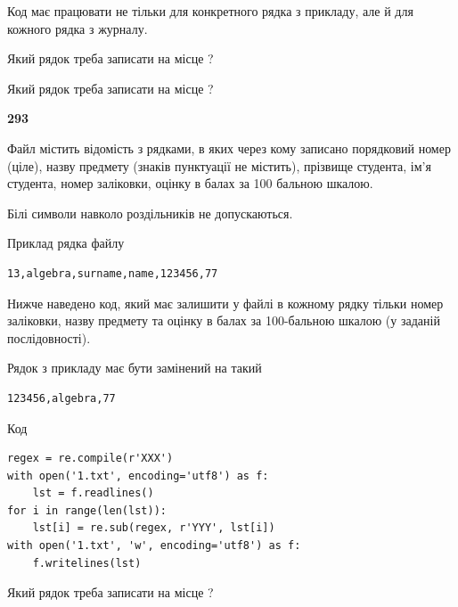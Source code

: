 Код має працювати не тільки для конкретного рядка з прикладу, але й для кожного рядка з журналу.




Який рядок треба записати на місце  ?\par
\vspace{5mm}


Який рядок треба записати на місце  ?\par


\newpage

{\begin {center}\textbf{ 293}\end {center}}\par
Файл  містить відомість з рядками, в яких через кому записа\-но поряд\-ковий номер (ціле), назву предмету (знаків пунктуації не містить), прізвище студента, ім'я студента, номер заліковки, оцінку в балах за 100 бальною шкалою.

Білі символи навколо роздільників не допускаються.

Приклад рядка файлу



\begin{verbatim}
13,algebra,surname,name,123456,77
\end{verbatim}


Нижче наведено код, який має залишити у файлі в кожному рядку тільки номер заліковки, назву предмету та оцінку в балах за 100-бальною шкалою (у заданій послі\-дов\-ності).

Рядок з прикладу має бути замінений на такий



\begin{verbatim}
123456,algebra,77
\end{verbatim}




Код



\begin{verbatim}
regex = re.compile(r'XXX')
with open('1.txt', encoding='utf8') as f:
    lst = f.readlines()
for i in range(len(lst)):
    lst[i] = re.sub(regex, r'YYY', lst[i])
with open('1.txt', 'w', encoding='utf8') as f:
    f.writelines(lst)
\end{verbatim}







Який рядок треба записати на місце  ?\par
\vspace{5mm}


